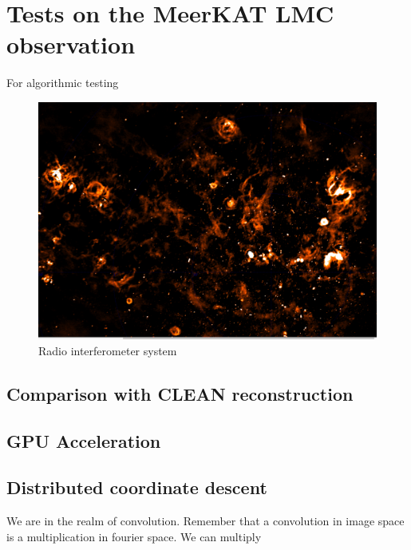 \section{Tests on the MeerKAT LMC observation}\label{results}
For algorithmic testing


	
\begin{figure}[h]
	\centering
	\includegraphics[width=0.80\linewidth]{./chapters/10.results/LMC/meerkat.png}
	\caption{Radio interferometer system}
	\label{results:radio}
\end{figure}



\subsection{Comparison with CLEAN reconstruction}

\subsection{GPU Acceleration}

\subsection{Distributed coordinate descent}




We are in the realm of convolution. Remember that a convolution in image space is a multiplication in fourier space.
We can multiply


